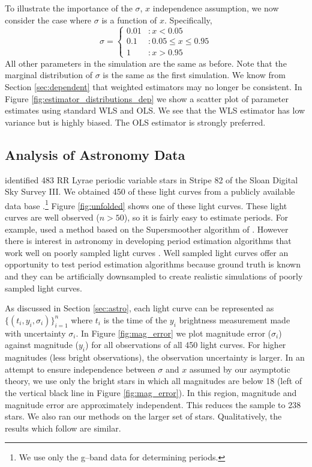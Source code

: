 \documentclass[ejs,ps,preprint]{imsart}
\numberwithin{equation}{section}
\theoremstyle{plain}
\begin{document}
To illustrate the importance of the $\sigma$, $x$ independence assumption, we now consider the case where $\sigma$ is a function of $x$. Specifically,
\begin{equation*}
  \sigma =    \left\{
  \begin{array}{lr}
    0.01 &:  x<0.05\\ 
    0.1  &: 0.05\leq x \leq 0.95\\
    1  &: x > 0.95
  \end{array} \right.
\end{equation*}
All other parameters in the simulation are the same as before. Note that the marginal distribution of $\sigma$ is the same as the first simulation. We know from Section \ref{sec:dependent} that weighted estimators may no longer be consistent. In Figure \ref{fig:estimator_distributions_dep} we show a scatter plot of parameter estimates using standard WLS and OLS. We see that the WLS estimator has low variance but is highly biased. The OLS estimator is strongly preferred.

\subsection{Analysis of Astronomy Data}

\cite{sesar2010light} identified 483 RR Lyrae periodic variable stars in Stripe 82 of the Sloan Digital Sky Survey III. We obtained 450 of these light curves from a publicly available data base \cite{ivezic2007sloan}.\footnote{We use only the g--band data for determining periods.} Figure \ref{fig:unfolded} shows one of these light curves. These light curves are well observed ($n > 50$), so it is fairly easy to estimate periods. For example, \cite{sesar2010light} used a method based on the Supersmoother algorithm of \cite{friedman1984variable}. However there is interest in astronomy in developing period estimation algorithms that work well on poorly sampled light curves \cite{vanderplas2015periodograms,mondrik2015multiband,long2014estimating,sesar2007exploring}. Well sampled light curves offer an opportunity to test period estimation algorithms because ground truth is known and they can be artificially downsampled to create realistic simulations of poorly sampled light curves.

As discussed in Section \ref{sec:astro}, each light curve can be represented as $\{(t_i,y_i,\sigma_i)\}_{i=1}^n$ where $t_i$ is the time of the $y_i$ brightness measurement made with uncertainty $\sigma_i$. In Figure \ref{fig:mag_error} we plot magnitude error ($\sigma_i$) against magnitude ($y_i$) for all observations of all 450 light curves. For higher magnitudes (less bright observations), the observation uncertainty is larger.  In an attempt to ensure independence between $\sigma$ and $x$ assumed by our asymptotic theory, we use only the bright stars in which all magnitudes are below 18 (left of the vertical black line in Figure \ref{fig:mag_error}). In this region, magnitude and magnitude error are approximately independent. This reduces the sample to 238 stars. We also ran our methods on the larger set of stars. Qualitatively, the results which follow are similar.
\end{document}
